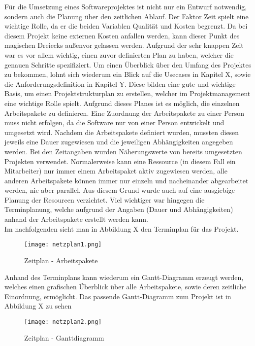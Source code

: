 Für die Umsetzung eines Softwareprojektes ist nicht nur ein Entwurf notwendig, sondern auch die Planung über den zeitlichen Ablauf. Der Faktor Zeit spielt eine wichtige Rolle, da er die beiden Variablen Qualität und Kosten begrenzt. Da bei diesem Projekt keine externen Kosten anfallen werden, kann dieser Punkt des magischen Dreiecks außenvor gelassen werden.
Aufgrund der sehr knappen Zeit war es vor allem wichtig, einen zuvor definierten Plan zu haben, welcher die genauen Schritte spezifiziert. Um einen Überblick über den Umfang des Projektes zu bekommen, lohnt sich wiederum ein Blick auf die Usecases in Kapitel X, sowie die Anforderungsdefinition in Kapitel Y. Diese bilden eine gute und wichtige Basis, um einen Projektstrukturplan zu erstellen, welcher im Projektmanagement eine wichtige Rolle spielt. Aufgrund dieses Planes ist es möglich, die einzelnen Arbeitspakete zu definieren. Eine Zuordnung der Arbeitspakete zu einer Person muss nicht erfolgen, da die Software nur von einer Person entwickelt und umgesetzt wird. Nachdem die Arbeitspakete definiert wurden, mussten diesen jeweils eine Dauer zugewiesen und die jeweiligen Abhängigkeiten angegeben werden.
Bei den Zeitangaben wurden Näherungswerte von bereits umgesetzten Projekten verwendet.
Normalerweise kann eine Ressource (in diesem Fall ein Mitarbeiter) nur immer einem Arbeitspaket aktiv zugewiesen werden, alle anderen Arbeitspakete können immer nur einzeln und nacheinander abgearbeitet werden, nie aber parallel. Aus diesem Grund wurde auch auf eine ausgiebige Planung der Resourcen verzichtet. Viel wichtiger war hingegen die Terminplanung, welche aufgrund der Angaben (Dauer und Abhängigkeiten) anhand der Arbeitspakete erstellt werden kann.\\
Im nachfolgenden sieht man in Abbildung X den Terminplan für das Projekt.\\

\begin{figure}[H]
\centering
\texttt{[image: netzplan1.png]}
\caption{Zeitplan - Arbeitspakete}
\label{fig:benchsnmpbulk}
\end{figure}

Anhand des Terminplans kann wiederum ein Gantt-Diagramm erzeugt werden, welches einen grafischen Überblick über alle Arbeitspakete, sowie deren zeitliche Einordnung, ermöglicht. Das passende Gantt-Diagramm zum Projekt ist in Abbildung X zu sehen

\begin{figure}[H]
\centering
\texttt{[image: netzplan2.png]}
\caption{Zeitplan - Ganttdiagramm}
\label{fig:benchsnmpbulk}
\end{figure}

